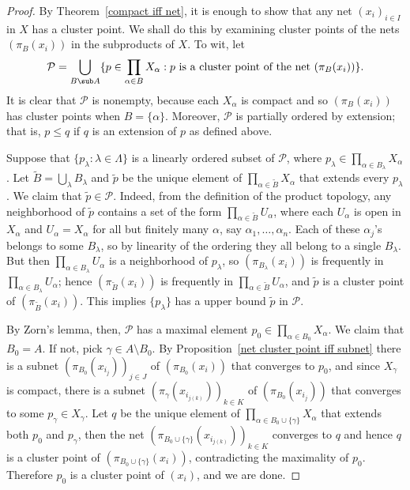 \begin{proof}
By Theorem~\ref{compact iff net}, it is enough to show that any net $(x_i)_{i\in I}$ in $X$ has a cluster point. We shall do this by examining cluster points of the nets $(\pi_B(x_i))$ in the subproducts of $X$. To wit, let
\[\mathcal{P}=\bigcup_{B\sub A}\{p\in\prod_{\alpha\in B}X_\alpha:\text{$p$ is a cluster point of the net $(\pi_B(x_i))$}\}.\]
It is clear that $\mathcal{P}$ is nonempty, because each $X_\alpha$ is compact and so $(\pi_B(x_i))$ has cluster points when $B=\{\alpha\}$. Moreover, $\mathcal{P}$ is partially ordered by extension; that is, $p\leq q$ if $q$ is an extension of $p$ as defined above.\par
Suppose that $\{p_\lambda:\lambda\in\Lambda\}$ is a linearly ordered subset of $\mathcal{P}$, where $p_\lambda\in\prod_{\alpha\in B_\lambda}X_\alpha$. Let $\widetilde{B}=\bigcup_\lambda B_\lambda$ and $\widetilde{p}$ be the unique element of $\prod_{\alpha\in\widetilde{B}}X_\alpha$ that extends every $p_\lambda$. We claim that $\widetilde{p}\in\mathcal{P}$. Indeed, from the definition of the product topology, any neighborhood of $\widetilde{p}$ contains a set of the form $\prod_{\alpha\in\widetilde{B}}U_\alpha$, where each $U_\alpha$ is open in $X_\alpha$ and $U_\alpha=X_\alpha$ for all but finitely many $\alpha$, say $\alpha_1,\dots,\alpha_n$. Each of these $\alpha_j$'s belongs to some $B_\lambda$, so by linearity of the ordering they all belong to a single $B_\lambda$. But then $\prod_{\alpha\in B_\lambda}U_\alpha$ is a neighborhood of $p_\lambda$, so $(\pi_{B_\lambda}(x_i))$ is frequently in $\prod_{\alpha\in B_\lambda}U_\alpha$; hence $(\pi_{\widetilde{B}}(x_i))$ is frequently in $\prod_{\alpha\in\widetilde{B}}U_\alpha$, and $\widetilde{p}$ is a cluster point of $(\pi_{\widetilde{B}}(x_i))$. This implies $\{p_\lambda\}$ has a upper bound $\widetilde{p}$ in $\mathcal{P}$.\par
By Zorn's lemma, then, $\mathcal{P}$ has a maximal element $p_0\in\prod_{\alpha\in B_0}X_\alpha$. We claim that $B_0=A$. If not, pick $\gamma\in A\setminus B_0$. By Proposition~\ref{net cluster point iff subnet} there is a subnet $(\pi_{B_0}(x_{i_j}))_{j\in J}$ of $(\pi_{B_0}(x_i))$ that converges to $p_0$, and since $X_\gamma$ is compact, there is a subnet $(\pi_\gamma(x_{i_{j(k)}}))_{k\in K}$ of $(\pi_{B_0}(x_{i_j}))$ that converges to some $p_\gamma\in X_\gamma$. Let $q$ be the unique element of $\prod_{\alpha\in B_0\cup\{\gamma\}}X_\alpha$ that extends both $p_0$ and $p_\gamma$, then the net $(\pi_{B_0\cup\{\gamma\}}(x_{i_{j(k)}}))_{k\in K}$ converges to $q$ and hence $q$ is a cluster point of $(\pi_{B_0\cup\{\gamma\}}(x_i))$, contradicting the maximality of $p_0$. Therefore $p_0$ is a cluster point of $(x_i)$, and we are done.
\end{proof}
